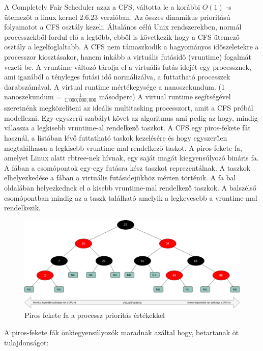 

A Completely Fair Scheduler azaz a CFS, váltotta le a korábbi $O(1)$ -s ütemezőt a linux kernel 2.6.23 verzióban.
Az összes dinamikus prioritású folyamatot a CFS osztály kezeli. Általános célú Unix rendszerekben, normál processzekből fordul elő a legtöbb, ebből is következik hogy a CFS ütemező osztály a legelfoglaltabb.
A CFS nem támaszkodik a hagyományos időszeletekre a processzor kiosztásakor, hanem inkább a virtuális futásidő (vruntime) fogalmát vezeti be.
A vruntime változó tárolja el a virtuális futás idejét egy processznek, ami igazából a tényleges futási idő normálizálva, a futtatható processzek darabszámával.
A virtual runtime mértékegysége a nanoszekundum. (1 nanoszekundum = $\frac{1}{1,000,000,000}$ másodperc)
A virtual runtime segítségével szeretnénk megközelíteni az ideális multitasking processzort, amit a CFS próbál modellezni. Egy egyszerű szabályt követ az algoritmus ami pedig az hogy, mindig válassza a legkisebb vruntime-al rendelkező taszkot. A CFS egy piros-fekete fát használ, a listában lévő futtatható taskok kezelésére és hogy egyszerűen megtalálhassa a legkisebb vruntime-mal rendelkező taskot.
A piros-fekete fa, amelyet Linux alatt rbtree-nek hívnak, egy saját magát kiegyensúlyozó bináris fa.
A fában a csomópontok egy-egy futásra kész taszkot reprezentálnak. A taszkok elhelyezkedése a fában a virtuális futásidejükhöz mérten történik. 
A fa bal oldalában helyezkednek el a kisebb vruntime-mal rendelkező taszkok.
A balszélső csomópontban mindig az a taszk található amelyik a legkevesebb a vruntime-mal rendelkezik.
\begin{figure}[h]
\centering
\includegraphics[width=\textwidth]{images/redBlackTree.png}
\caption{Piros fekete fa a processz prioritás értékekkel}
\label{fig:rb_tree}
\end{figure}

\noindent A piros-fekete fák önkiegyensúlyozók maradnak azáltal hogy, betartanak öt tulajdonságot:

